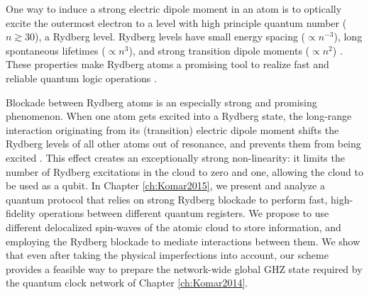 One way to induce a strong electric dipole moment in an atom is to optically
excite the outermost electron to a level with high principle quantum number ($n
\gtrsim 30$), a Rydberg level. Rydberg levels have small energy spacing
($\propto n^{-3}$), long spontaneous lifetimes ($\propto n^3$), and strong
transition dipole moments ($\propto n^2$) \cite{Saffman2010}. These properties
make Rydberg atoms a promising tool to realize fast and reliable quantum
logic operations \cite{Lukin2001}.  

Blockade between Rydberg atoms is an especially strong and promising phenomenon.
When one atom gets excited into a Rydberg state, the long-range interaction
originating from its (transition) electric dipole moment shifts the Rydberg
levels of all other atoms out of resonance, and prevents them from being excited
\cite{Urban2009}. This effect creates an exceptionally strong non-linearity: it
limits the number of Rydberg excitations in the cloud to zero and one, allowing
the cloud to be used as a qubit. In Chapter \ref{ch:Komar2015}, we present and
analyze a quantum protocol that relies on strong Rydberg blockade to perform
fast, high-fidelity operations between different quantum registers. We propose
to use different delocalized spin-waves of the atomic cloud to store
information, and employing the Rydberg blockade to mediate interactions between
them. We show that even after taking the physical imperfections into account,
our scheme provides a feasible way to prepare the network-wide global GHZ state
required by the quantum clock network of Chapter \ref{ch:Komar2014}.

 









